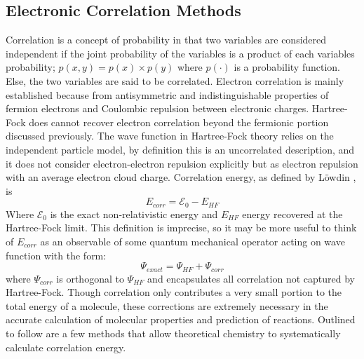   \subsection{Electronic Correlation Methods}
    Correlation is a concept of probability in that two variables are considered independent if the joint probability of the variables is a product of each variables probability; $p(x,y) = p(x) \times p(y)$ where $p(\cdot)$ is a probability function.  Else, the two variables are said to be correlated.\cite{Kutzelnigg 2003}  Electron correlation is mainly established because from antisymmetric and indistinguishable properties of fermion electrons and Coulombic repulsion between electronic charges. Hartree-Fock does cannot recover electron correlation beyond the fermionic portion discussed previously.  The wave function in Hartree-Fock theory relies on the independent particle model, by definition this is an uncorrelated description,  and it does not consider electron-electron repulsion explicitly but as electron repulsion with an average electron cloud charge.  Correlation energy, as defined by L{\"o}wdin \cite{Lowdin 1959}, is 
      \begin{equation}
      E_{corr} = \mathcal{E}_{0} - E_{HF}
      \end{equation}
    Where $\mathcal{E}_0$ is the exact non-relativistic energy and $E_{HF}$ energy recovered at the Hartree-Fock limit.  This definition is imprecise, so it may be more useful to think of $E_{corr}$ as an observable of some quantum mechanical operator acting on wave function with the form:
      \begin{equation}
      \Psi_{exact} = \Psi_{HF} + \Psi_{corr}
      \end{equation}
    where $\Psi_{corr}$ is orthogonal to $\Psi_{HF}$ and encapsulates all correlation not captured by Hartree-Fock.\cite{Kong 2012}  Though correlation only contributes a very small portion to the total energy of a molecule, these corrections are extremely necessary in the accurate calculation of molecular properties and prediction of reactions.  Outlined to follow are a few methods that allow theoretical chemistry to systematically calculate correlation energy.



